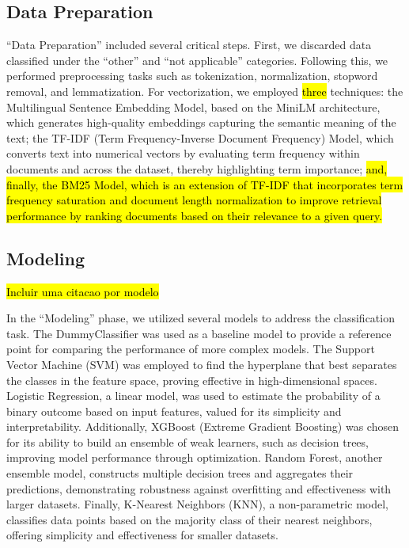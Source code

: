 \documentclass[12pt]{article}
\newcommand{\revisar}[1]{\hl{#1}}
\newcommand{\todo}[1]{\hl{#1}}
\begin{document}
\subsection{Data Preparation}

``Data Preparation'' included several critical steps. First, we discarded data classified under the “other” and “not applicable” categories. Following this, we performed preprocessing tasks such as tokenization, normalization, stopword removal, and lemmatization. For vectorization, we employed \revisar{three} techniques: the Multilingual Sentence Embedding Model, based on the MiniLM architecture, which generates high-quality embeddings capturing the semantic meaning of the text; the TF-IDF (Term Frequency-Inverse Document Frequency) Model, which converts text into numerical vectors by evaluating term frequency within documents and across the dataset, thereby highlighting term importance; \revisar{and, finally, the BM25 Model, which is an extension of TF-IDF that incorporates term frequency saturation and document length normalization to improve retrieval performance by ranking documents based on their relevance to a given query.}

\subsection{Modeling}

\todo{Incluir uma citacao por modelo}


In the ``Modeling'' phase, we utilized several models to address the classification task. The DummyClassifier was used as a baseline model to provide a reference point for comparing the performance of more complex models. The Support Vector Machine (SVM) was employed to find the hyperplane that best separates the classes in the feature space, proving effective in high-dimensional spaces. Logistic Regression, a linear model, was used to estimate the probability of a binary outcome based on input features, valued for its simplicity and interpretability. Additionally, XGBoost (Extreme Gradient Boosting) was chosen for its ability to build an ensemble of weak learners, such as decision trees, improving model performance through optimization. Random Forest, another ensemble model, constructs multiple decision trees and aggregates their predictions, demonstrating robustness against overfitting and effectiveness with larger datasets. Finally, K-Nearest Neighbors (KNN), a non-parametric model, classifies data points based on the majority class of their nearest neighbors, offering simplicity and effectiveness for smaller datasets.
\end{document}

